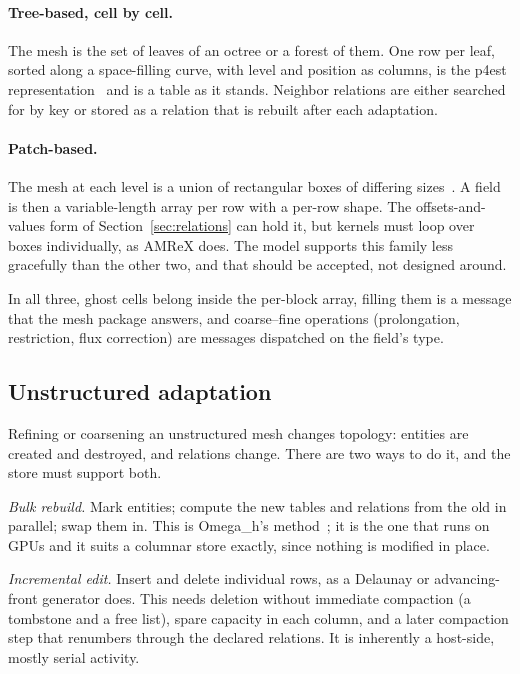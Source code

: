 \documentclass[11pt,a4paper]{article}
\begin{document}
\paragraph{Tree-based, cell by cell.}  The mesh is the set of leaves of an
octree or a forest of them.  One row per leaf, sorted along a space-filling
curve, with level and position as columns, is the p4est
representation~\cite{p4est} and is a table as it stands.  Neighbor relations
are either searched for by key or stored as a relation that is rebuilt after
each adaptation.

\paragraph{Patch-based.}  The mesh at each level is a union of rectangular
boxes of differing sizes~\cite{bergercolella,amrex}.  A field is then a
variable-length array per row with a per-row shape.  The offsets-and-values
form of Section~\ref{sec:relations} can hold it, but kernels must loop over
boxes individually, as AMReX does.  The model supports this family less
gracefully than the other two, and that should be accepted, not designed
around.

In all three, ghost cells belong inside the per-block array, filling them is a
message that the mesh package answers, and coarse--fine operations
(prolongation, restriction, flux correction) are messages dispatched on the
field's type.

\subsection{Unstructured adaptation}

Refining or coarsening an unstructured mesh changes topology: entities are
created and destroyed, and relations change.  There are two ways to do it,
and the store must support both.

\emph{Bulk rebuild.}  Mark entities; compute the new tables and relations
from the old in parallel; swap them in.  This is Omega\_h's
method~\cite{omegah}; it is the one that runs on GPUs and it suits a columnar
store exactly, since nothing is modified in place.

\emph{Incremental edit.}  Insert and delete individual rows, as a Delaunay
or advancing-front generator does.  This needs deletion without immediate
compaction (a tombstone and a free list), spare capacity in each column, and
a later compaction step that renumbers through the declared relations.  It is
inherently a host-side, mostly serial activity.
\end{document}
